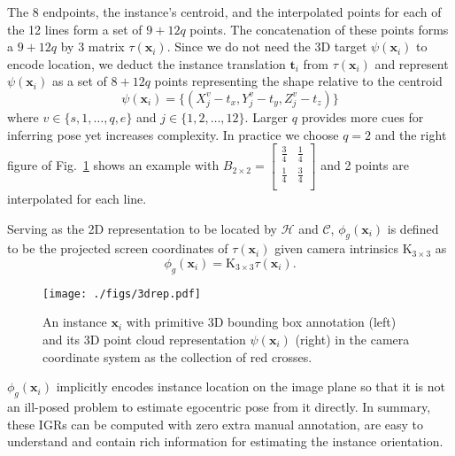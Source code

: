 \documentclass[final]{cvpr}
\begin{document}
The 8 endpoints, the instance's centroid, and the interpolated points for each of the 12 lines form a set of $9 + 12q$ points. The concatenation of these points forms a $9 + 12q $ by $3$ matrix $\tau(\mathbf{x}_i)$. Since we do not need the 3D target $\psi(\mathbf{x}_i)$ to encode location, we deduct the instance translation $\mathbf{t}_i$ from $\tau(\mathbf{x}_i)$ and represent $\psi(\mathbf{x}_i)$ as a set of $8 + 12q$ points representing the shape relative to the centroid  
\begin{equation}
\psi(\mathbf{x}_i) = \{(X_{j}^{v} - t_x, Y_{j}^{v} - t_y, Z_{j}^{v} - t_z)\}
\end{equation}
where $v\in\{s,1,\dots,q,e\}$ and $j\in\{1,2,\dots,12\}$.
Larger $q$ provides more cues for inferring pose yet increases complexity. In practice we choose $q=2$ and the right figure of Fig.~\ref{fig:3drep} shows an example with 
$B_{2 \times 2}= \begin{bmatrix}
\frac{3}{4} & \frac{1}{4} \\
\frac{1}{4} & \frac{3}{4} \\
\end{bmatrix}
$
and 2 points are interpolated for each line.

Serving as the 2D representation to be located by $\mathcal{H}$ and $\mathcal{C}$, $\phi_g(\mathbf{x}_i)$ is defined to be the projected screen coordinates of $\tau(\mathbf{x}_i)$ given camera intrinsics $\text{K}_{3 \times 3}$ as
\begin{equation}
\phi_g(\mathbf{x}_i) = \text{K}_{3 \times 3} \tau(\mathbf{x}_i).
\end{equation}
\begin{figure}[t]
	\begin{center}
		\texttt{[image: ./figs/3drep.pdf]}
	\end{center}
	\caption{An instance $\mathbf{x}_i$ with primitive 3D bounding box annotation (left) and its 3D point cloud representation $\psi(\mathbf{x}_i)$ (right) in the camera coordinate system as the collection of red crosses.}
	\label{fig:3drep}
\end{figure}
$\phi_g(\mathbf{x}_i)$ implicitly encodes instance location on the image plane so that it is not an ill-posed problem to estimate egocentric pose from it directly. In summary, these IGRs can be computed with zero extra manual annotation, are easy to understand and contain rich information for estimating the instance orientation.
\end{document}
